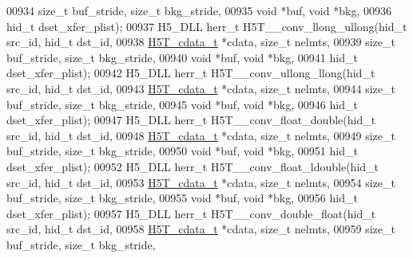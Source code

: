 \begin{DoxyCode}
00934                      \textcolor{keywordtype}{size\_t} buf\_stride, \textcolor{keywordtype}{size\_t} bkg\_stride,
00935                                      \textcolor{keywordtype}{void} *buf, \textcolor{keywordtype}{void} *bkg,
00936                                      hid\_t dset\_xfer\_plist);
00937 H5\_DLL herr\_t H5T\_\_conv\_llong\_ullong(hid\_t src\_id, hid\_t dst\_id,
00938                      \hyperlink{struct_h5_t__cdata__t}{H5T\_cdata\_t} *cdata, \textcolor{keywordtype}{size\_t} nelmts,
00939                      \textcolor{keywordtype}{size\_t} buf\_stride, \textcolor{keywordtype}{size\_t} bkg\_stride,
00940                                      \textcolor{keywordtype}{void} *buf, \textcolor{keywordtype}{void} *bkg,
00941                                      hid\_t dset\_xfer\_plist);
00942 H5\_DLL herr\_t H5T\_\_conv\_ullong\_llong(hid\_t src\_id, hid\_t dst\_id,
00943                      \hyperlink{struct_h5_t__cdata__t}{H5T\_cdata\_t} *cdata, \textcolor{keywordtype}{size\_t} nelmts,
00944                      \textcolor{keywordtype}{size\_t} buf\_stride, \textcolor{keywordtype}{size\_t} bkg\_stride,
00945                                      \textcolor{keywordtype}{void} *buf, \textcolor{keywordtype}{void} *bkg,
00946                                      hid\_t dset\_xfer\_plist);
00947 H5\_DLL herr\_t H5T\_\_conv\_float\_double(hid\_t src\_id, hid\_t dst\_id,
00948                      \hyperlink{struct_h5_t__cdata__t}{H5T\_cdata\_t} *cdata, \textcolor{keywordtype}{size\_t} nelmts,
00949                      \textcolor{keywordtype}{size\_t} buf\_stride, \textcolor{keywordtype}{size\_t} bkg\_stride,
00950                                      \textcolor{keywordtype}{void} *buf, \textcolor{keywordtype}{void} *bkg,
00951                                      hid\_t dset\_xfer\_plist);
00952 H5\_DLL herr\_t H5T\_\_conv\_float\_ldouble(hid\_t src\_id, hid\_t dst\_id,
00953                      \hyperlink{struct_h5_t__cdata__t}{H5T\_cdata\_t} *cdata, \textcolor{keywordtype}{size\_t} nelmts,
00954                      \textcolor{keywordtype}{size\_t} buf\_stride, \textcolor{keywordtype}{size\_t} bkg\_stride,
00955                                      \textcolor{keywordtype}{void} *buf, \textcolor{keywordtype}{void} *bkg,
00956                                      hid\_t dset\_xfer\_plist);
00957 H5\_DLL herr\_t H5T\_\_conv\_double\_float(hid\_t src\_id, hid\_t dst\_id,
00958                      \hyperlink{struct_h5_t__cdata__t}{H5T\_cdata\_t} *cdata, \textcolor{keywordtype}{size\_t} nelmts,
00959                      \textcolor{keywordtype}{size\_t} buf\_stride, \textcolor{keywordtype}{size\_t} bkg\_stride,

\end{DoxyCode}
